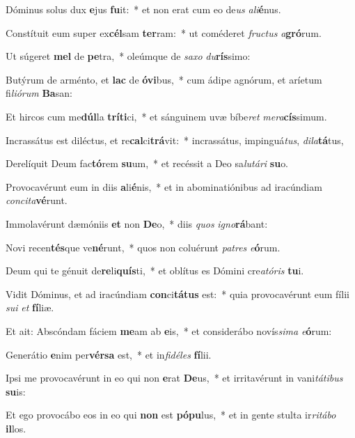 \item Dóminus solus dux \textbf{e}jus \textbf{fu}it:~* et non erat cum eo de\textit{us} \textit{a}\textit{li}\textbf{é}nus.
\item Constítuit eum super ex\textbf{cél}sam \textbf{ter}ram:~* ut coméderet \textit{fruc}\textit{tus} \textit{a}\textbf{gró}rum.
\item Ut súgeret \textbf{mel} de \textbf{pe}tra,~* oleúmque de \textit{sa}\textit{xo} \textit{du}\textbf{rís}simo:
\item Butýrum de arménto, et \textbf{lac} de \textbf{ó}\textbf{vi}bus,~* cum ádipe agnórum, et aríetum fi\textit{li}\textit{ó}\textit{rum} \textbf{Ba}san:
\item Et hircos cum me\textbf{dúl}la \textbf{trí}\textbf{ti}ci,~* et sánguinem uvæ bíbe\textit{ret} \textit{me}\textit{ra}\textbf{cís}simum.
\item Incrassátus est diléctus, et re\textbf{cal}ci\textbf{trá}vit:~* incrassátus, impinguá\textit{tus}, \textit{di}\textit{la}\textbf{tá}tus,
\item Derelíquit Deum fac\textbf{tó}rem \textbf{su}um,~* et recéssit a Deo sa\textit{lu}\textit{tá}\textit{ri} \textbf{su}o.
\item Provocavérunt eum in diis \textbf{a}li\textbf{é}nis,~* et in abominatiónibus ad iracúndiam \textit{con}\textit{ci}\textit{ta}\textbf{vé}runt.
\item Immolavérunt dæmóniis \textbf{et} non \textbf{De}o,~* diis \textit{quos} \textit{i}\textit{gno}\textbf{rá}bant:
\item Novi recen\textbf{tés}que ve\textbf{né}runt,~* quos non coluérunt \textit{pa}\textit{tres} \textit{e}\textbf{ó}rum.
\item Deum qui te génuit de\textbf{re}li\textbf{quís}ti,~* et oblítus es Dómini cre\textit{a}\textit{tó}\textit{ris} \textbf{tu}i.
\item Vidit Dóminus, et ad iracúndiam \textbf{con}ci\textbf{tá}\textbf{tus} est:~* quia provocavérunt eum fílii \textit{su}\textit{i} \textit{et} \textbf{fí}liæ.
\item Et ait: Abscóndam fáciem \textbf{me}am ab \textbf{e}is,~* et considerábo novís\textit{si}\textit{ma} \textit{e}\textbf{ó}rum:
\item Generátio \textbf{e}nim per\textbf{vér}\textbf{sa} est,~* et in\textit{fi}\textit{dé}\textit{les} \textbf{fí}lii.
\item Ipsi me provocavérunt in eo qui non \textbf{e}rat \textbf{De}us,~* et irritavérunt in vani\textit{tá}\textit{ti}\textit{bus} \textbf{su}is:
\item Et ego provocábo eos in eo qui \textbf{non} est \textbf{pó}\textbf{pu}lus,~* et in gente stulta ir\textit{ri}\textit{tá}\textit{bo} \textbf{il}los.

